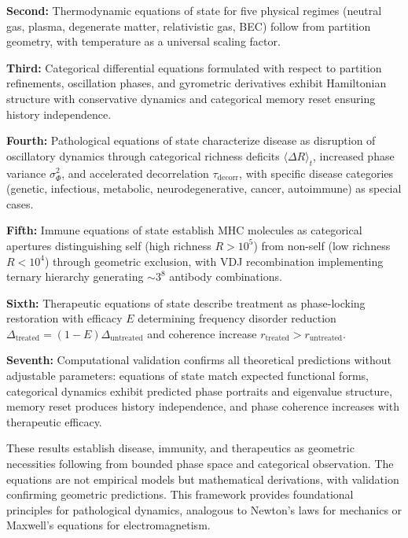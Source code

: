 \documentclass[11pt,twocolumn,a4paper]{article}
\theoremstyle{definition}
\theoremstyle{remark}
\newcommand{\taudecorr}{\tau_{\mathrm{decorr}}}
\begin{document}
\textbf{Second:} Thermodynamic equations of state for five physical regimes (neutral gas, plasma, degenerate matter, relativistic gas, BEC) follow from partition geometry, with temperature as a universal scaling factor.

\textbf{Third:} Categorical differential equations formulated with respect to partition refinements, oscillation phases, and gyrometric derivatives exhibit Hamiltonian structure with conservative dynamics and categorical memory reset ensuring history independence.

\textbf{Fourth:} Pathological equations of state characterize disease as disruption of oscillatory dynamics through categorical richness deficits $\langle\Delta R\rangle_t$, increased phase variance $\sigma_\Phi^2$, and accelerated decorrelation $\taudecorr$, with specific disease categories (genetic, infectious, metabolic, neurodegenerative, cancer, autoimmune) as special cases.

\textbf{Fifth:} Immune equations of state establish MHC molecules as categorical apertures distinguishing self (high richness $R > 10^5$) from non-self (low richness $R < 10^4$) through geometric exclusion, with VDJ recombination implementing ternary hierarchy generating $\sim 3^8$ antibody combinations.

\textbf{Sixth:} Therapeutic equations of state describe treatment as phase-locking restoration with efficacy $E$ determining frequency disorder reduction $\Delta_{\mathrm{treated}} = (1-E)\Delta_{\mathrm{untreated}}$ and coherence increase $r_{\mathrm{treated}} > r_{\mathrm{untreated}}$.

\textbf{Seventh:} Computational validation confirms all theoretical predictions without adjustable parameters: equations of state match expected functional forms, categorical dynamics exhibit predicted phase portraits and eigenvalue structure, memory reset produces history independence, and phase coherence increases with therapeutic efficacy.

These results establish disease, immunity, and therapeutics as geometric necessities following from bounded phase space and categorical observation. The equations are not empirical models but mathematical derivations, with validation confirming geometric predictions. This framework provides foundational principles for pathological dynamics, analogous to Newton's laws for mechanics or Maxwell's equations for electromagnetism.



\end{document}

